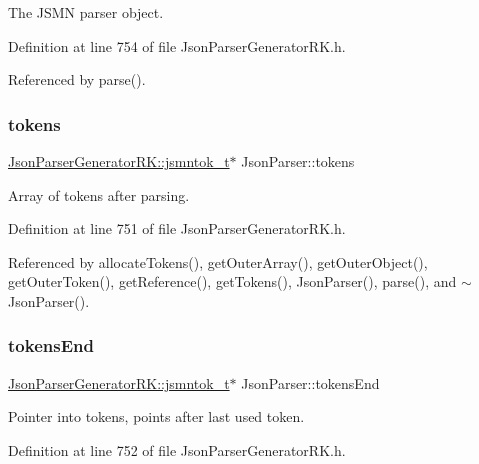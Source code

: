 The J\+S\+MN parser object. 



Definition at line 754 of file Json\+Parser\+Generator\+R\+K.\+h.



Referenced by parse().

\mbox{\label{class_json_parser_af2a9bba1dc92b0c38d0cab6fdad76216}} 
\subsubsection{\texorpdfstring{tokens}{tokens}}
{\footnotesize\ttfamily \hyperlink{struct_json_parser_generator_r_k_1_1jsmntok__t}{Json\+Parser\+Generator\+R\+K\+::jsmntok\+\_\+t}$\ast$ Json\+Parser\+::tokens\hspace{0.3cm}{\ttfamily [protected]}}



Array of tokens after parsing. 



Definition at line 751 of file Json\+Parser\+Generator\+R\+K.\+h.



Referenced by allocate\+Tokens(), get\+Outer\+Array(), get\+Outer\+Object(), get\+Outer\+Token(), get\+Reference(), get\+Tokens(), Json\+Parser(), parse(), and $\sim$\+Json\+Parser().

\mbox{\label{class_json_parser_a6b8c13ce885f8bc7470248d0dc56f157}} 
\subsubsection{\texorpdfstring{tokens\+End}{tokensEnd}}
{\footnotesize\ttfamily \hyperlink{struct_json_parser_generator_r_k_1_1jsmntok__t}{Json\+Parser\+Generator\+R\+K\+::jsmntok\+\_\+t}$\ast$ Json\+Parser\+::tokens\+End\hspace{0.3cm}{\ttfamily [protected]}}



Pointer into tokens, points after last used token. 



Definition at line 752 of file Json\+Parser\+Generator\+R\+K.\+h.



